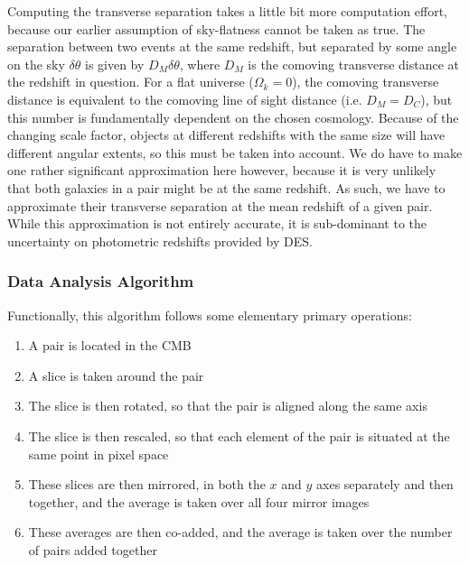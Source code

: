 \par Computing the transverse separation takes a little bit more computation effort, because our earlier assumption of sky-flatness cannot be taken as true. The separation between two events at the same redshift, but separated by some angle on the sky $\delta \theta$ is given by $D_M \delta \theta$, where $D_M$ is the comoving transverse distance at the redshift in question. For a flat universe ($\Omega_k = 0$), the comoving transverse distance is equivalent to the comoving line of sight distance (i.e. $D_M = D_C$), but this number is fundamentally dependent on the chosen cosmology. Because of the changing scale factor, objects at different redshifts with the same size will have different angular extents, so this must be taken into account. We do have to make one rather significant approximation here however, because it is very unlikely that both galaxies in a pair might be at the same redshift. As such, we have to approximate their transverse separation at the mean redshift of a given pair. While this approximation is not entirely accurate, it is sub-dominant to the uncertainty on photometric redshifts provided by DES. 


\subsubsection{Data Analysis Algorithm} \label{alg:analysis}
Functionally, this algorithm follows some elementary primary operations:
\begin{enumerate}%
\item A pair is located in the CMB \label{alg:stack:step:1}
\item A slice is taken around the pair \label{alg:stack:step:2}
\item The slice is then rotated, so that the pair is aligned along the same axis \label{alg:stack:step:3}
\item The slice is then rescaled, so that each element of the pair is situated at the same point in pixel space \label{alg:stack:step:4}
\item These slices are then mirrored, in both the $x$ and $y$ axes separately and then together, and the average is taken over all four mirror images \label{alg:stack:step:5}
\item These averages are then co-added, and the average is taken over the number of pairs added together \label{alg:stack:step:6}
\end{enumerate}


